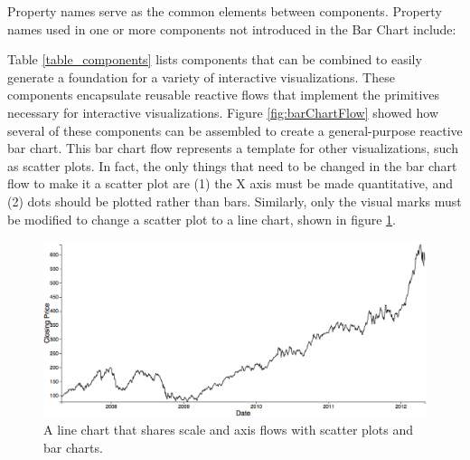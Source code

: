 Property names serve as the common elements between components. Property names used in one or more components not introduced in the Bar Chart include:


Table \ref{table_components} lists components that can be combined to easily generate a foundation for a variety of interactive visualizations. These components encapsulate reusable reactive flows that implement the primitives necessary for interactive visualizations. Figure \ref{fig:barChartFlow} showed how several of these components can be assembled to create a general-purpose reactive bar chart. This bar chart flow represents a template for other visualizations, such as scatter plots. In fact, the only things that need to be changed in the bar chart flow to make it a scatter plot are (1) the X axis must be made quantitative, and (2) dots should be plotted rather than bars. Similarly, only the visual marks must be modified to change a scatter plot to a line chart, shown in figure \ref{fig:lineChart}.

\begin{figure}
  \centering
  \includegraphics[width=\figureWidth]{figs/lineChart.png}
  \caption [Reactive Line Chart]{A line chart that shares scale and axis flows with scatter plots and bar charts.}
  \label{fig:lineChart}
\end{figure}


